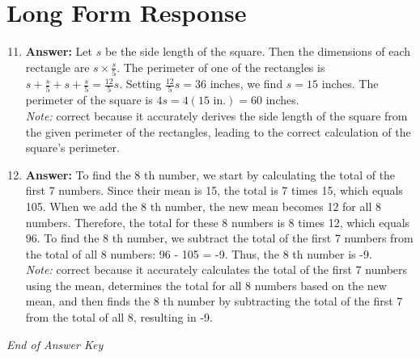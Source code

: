 \documentclass[12pt]{article}
\begin{document}
\section*{Long Form Response}
\begin{enumerate}[label=\arabic*.]
\setcounter{enumi}{10}
\item \textbf{Answer:} Let $s$ be the side length of the square. Then the dimensions of each rectangle are $s\times\frac{s}{5}$. The perimeter of one of the rectangles is $s+\frac{s}{5}+s+\frac{s}{5}=\frac{12}{5}s$. Setting $\frac{12}{5}s=36$ inches, we find $s=15$ inches. The perimeter of the square is $4 s=4(15\text{ in.})=\boxed{60}$ inches.
\\ \textit{Note:} correct because it accurately derives the side length of the square from the given perimeter of the rectangles, leading to the correct calculation of the square's perimeter.
\item \textbf{Answer:} To find the 8 th number, we start by calculating the total of the first 7 numbers. Since their mean is 15, the total is 7 times 15, which equals 105. When we add the 8 th number, the new mean becomes 12 for all 8 numbers. Therefore, the total for these 8 numbers is 8 times 12, which equals 96. To find the 8 th number, we subtract the total of the first 7 numbers from the total of all 8 numbers: 96 - 105 = -9. Thus, the 8 th number is -9.
\\ \textit{Note:} correct because it accurately calculates the total of the first 7 numbers using the mean, determines the total for all 8 numbers based on the new mean, and then finds the 8 th number by subtracting the total of the first 7 from the total of all 8, resulting in -9.
\end{enumerate}

\vfill
\noindent\textit{End of Answer Key}
\end{document}
